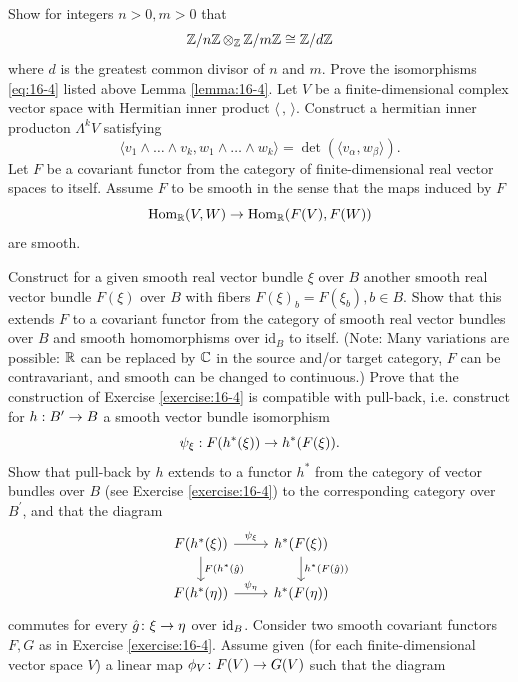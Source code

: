 \begin{enumerate}[\theexercise.1]
  \newchap[16]
  \NewItem Show for integers $n > 0,m > 0$ that
    \[
      \mathbb{Z}/n\mathbb{Z}\,{ \otimes  }_{\mathbb{Z}}\,\mathbb{Z}/m\mathbb{Z} \cong  \mathbb{Z}/d\mathbb{Z}
    \]
    where $d$ is the greatest common divisor of $n$ and $m$.
  \NewItem Prove the isomorphisms \eqref{eq:16-4} listed above Lemma \ref{lemma:16-4}.
  \NewItem Let $V$ be a finite-dimensional complex vector space with Hermitian inner product $\langle\,,\, \rangle$. Construct a hermitian inner producton $\Lambda^kV$ satisfying
    \[
      \langle  {{v}_{1} \land  \ldots  \land  {v}_{k},{w}_{1} \land  \ldots  \land  {w}_{k}}\rangle   = \det ( \langle  {{v}_{\alpha },{w}_{\beta }}\rangle  ).
    \]
  \NewItem Let $F$ be a covariant functor from the category of finite-dimensional real vector spaces to itself. Assume $F$ to be smooth in the sense that the maps induced by $F$
    \[
      {\mathrm{Hom}}_{{\mathbb{R}}}( {V,W})  \rightarrow  {\ensuremath{\mathrm{Hom}}}_{{\mathbb{R}}}( {F( V),F( W) })
    \]
    are smooth.\par
    Construct for a given smooth real vector bundle $\xi$ over $B$ another smooth real vector bundle $F( \xi )$ over $B$ with fibers $F{( \xi ) }_{b} = F( {\xi }_{b}),b \in  B$.
    Show that this extends $F$ to a covariant functor from the category of smooth real vector bundles over $B$ and smooth homomorphisms over ${\mathrm{{id}}}_{B}$ to itself. (Note: Many variations are possible: $\mathbb{R}$ can be replaced by $\mathbb{C}$ in the source and/or target category, $F$ can be contravariant, and smooth can be changed to continuous.)
  \NewItem Prove that the construction of Exercise \ref{exercise:16-4} is compatible with pull-back, i.e. construct for $h : {B}^{\prime } \rightarrow  B$ a smooth vector bundle isomorphism
    \[
      {\psi }_{\xi } : F( {{h}^*( \xi ) })  \rightarrow  {h}^*( {F( \xi ) }).
    \]
    Show that pull-back by $h$ extends to a functor ${h}^*$ from the category of vector bundles over $B$ (see Exercise \ref{exercise:16-4}) to the corresponding category over ${B}^{\prime }$, and that the diagram
    \[\begin{tikzcd}
      F(h^*(\xi)) \rar{\psi_\xi}\dar{F(h^*(\hat{g})} & h^*(F(\xi))\dar{h^*(F( \hat{g}))} \\
      F( {{h}^*( \eta ) }) \rar{\psi_\eta } & h^*(F(\eta))
    \end{tikzcd}\]
    commutes for every $\hat{g}\colon \xi \rightarrow \eta$ over ${\mathrm{id}}_{B}$.
  \NewItem Consider two smooth covariant functors $F,G$ as in Exercise \ref{exercise:16-4}. Assume given (for each finite-dimensional vector space $V$) a linear map ${\phi }_{V}\colon F( V)  \rightarrow  G( V)$ such that the diagram
    \[\begin{tikzcd}

\end{tikzcd}\]
\end{enumerate}
